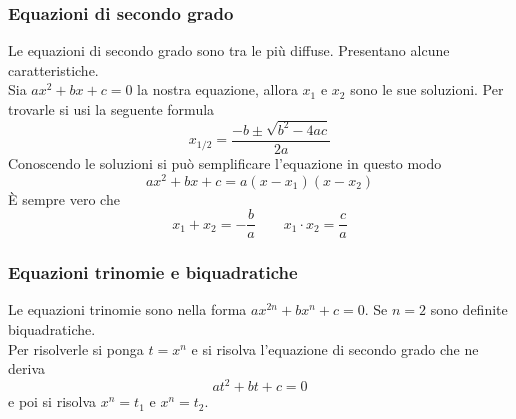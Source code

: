 \subsubsection{Equazioni di secondo grado}
Le equazioni di secondo grado sono tra le più diffuse. Presentano alcune caratteristiche.\\
Sia $ax^2 + bx + c = 0$ la nostra equazione, allora $x_1$ e $x_2$ sono le sue soluzioni. Per trovarle
si usi la seguente formula
\begin{equation*}
  x_{1/2} = \frac{-b\pm\sqrt{b^2-4ac}}{2a}
\end{equation*}
Conoscendo le soluzioni si può semplificare l'equazione in questo modo
\begin{equation*}
  ax^2+bx+c=a(x-x_1)(x-x_2)
\end{equation*}
È sempre vero che
\begin{equation*}
  x_1+x_2 = -\frac{b}{a} \qquad x_1\cdot x_2 = \frac{c}{a}
\end{equation*}

\subsubsection{Equazioni trinomie e biquadratiche}
Le equazioni trinomie sono nella forma $ax^{2n} + bx^n + c =0$. Se $n=2$ sono definite biquadratiche.\\
Per risolverle si ponga $t = x^n$ e si risolva l'equazione di secondo grado che ne deriva
\begin{equation*}
  at^2 + bt + c = 0
\end{equation*}
e poi si risolva $x^n = t_1$ e $x^n = t_2$.


